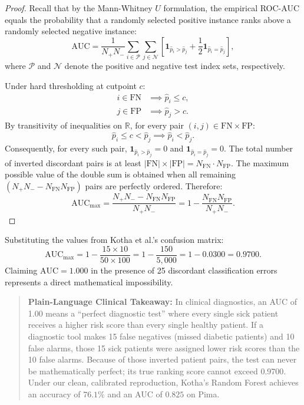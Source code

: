 \documentclass[journal,twocolumn]{IEEEtran}
\begin{document}
\begin{proof}
Recall that by the Mann-Whitney $U$ formulation, the empirical ROC-AUC equals the probability that a randomly selected positive instance ranks above a randomly selected negative instance:
\begin{equation}
\text{AUC} = \frac{1}{N_+ N_-} \sum_{i \in \mathcal{P}} \sum_{j \in \mathcal{N}} \left[ \mathbf{1}_{\hat{p}_i > \hat{p}_j} + \frac{1}{2}\mathbf{1}_{\hat{p}_i = \hat{p}_j} \right],
\end{equation}
where $\mathcal{P}$ and $\mathcal{N}$ denote the positive and negative test index sets, respectively.

Under hard thresholding at cutpoint $c$:
\begin{align}
i \in \text{FN} &\implies \hat{p}_i \le c, \\
j \in \text{FP} &\implies \hat{p}_j > c.
\end{align}
By transitivity of inequalities on $\mathbb{R}$, for every pair $(i, j) \in \text{FN} \times \text{FP}$:
\begin{equation}
\hat{p}_i \le c < \hat{p}_j \implies \hat{p}_i < \hat{p}_j.
\end{equation}
Consequently, for every such pair, $\mathbf{1}_{\hat{p}_i > \hat{p}_j} = 0$ and $\mathbf{1}_{\hat{p}_i = \hat{p}_j} = 0$. The total number of inverted discordant pairs is at least $|\text{FN}| \times |\text{FP}| = N_{\text{FN}} \cdot N_{\text{FP}}$. The maximum possible value of the double sum is obtained when all remaining $(N_+ N_- - N_{\text{FN}} N_{\text{FP}})$ pairs are perfectly ordered. Therefore:
\begin{equation}
\text{AUC}_{\max} = \frac{N_+ N_- - N_{\text{FN}} N_{\text{FP}}}{N_+ N_-} = 1 - \frac{N_{\text{FN}} N_{\text{FP}}}{N_+ N_-}.
\end{equation}
\end{proof}

Substituting the values from Kotha et al.'s confusion matrix:
\begin{equation}
\text{AUC}_{\max} = 1 - \frac{15 \times 10}{50 \times 100} = 1 - \frac{150}{5{,}000} = 1 - 0.0300 = 0.9700.
\end{equation}
Claiming $\text{AUC} = 1.000$ in the presence of 25 discordant classification errors represents a direct mathematical impossibility. 

\begin{quote}
\small
\textbf{Plain-Language Clinical Takeaway:} In clinical diagnostics, an AUC of 1.00 means a ``perfect diagnostic test'' where every single sick patient receives a higher risk score than every single healthy patient. If a diagnostic tool makes 15 false negatives (missed diabetic patients) and 10 false alarms, those 15 sick patients were assigned lower risk scores than the 10 false alarms. Because of those inverted patient pairs, the test can never be mathematically perfect; its true ranking score cannot exceed 0.9700. Under our clean, calibrated reproduction, Kotha's Random Forest achieves an accuracy of $76.1\%$ and an AUC of $0.825$ on Pima.
\end{quote}
\end{document}
